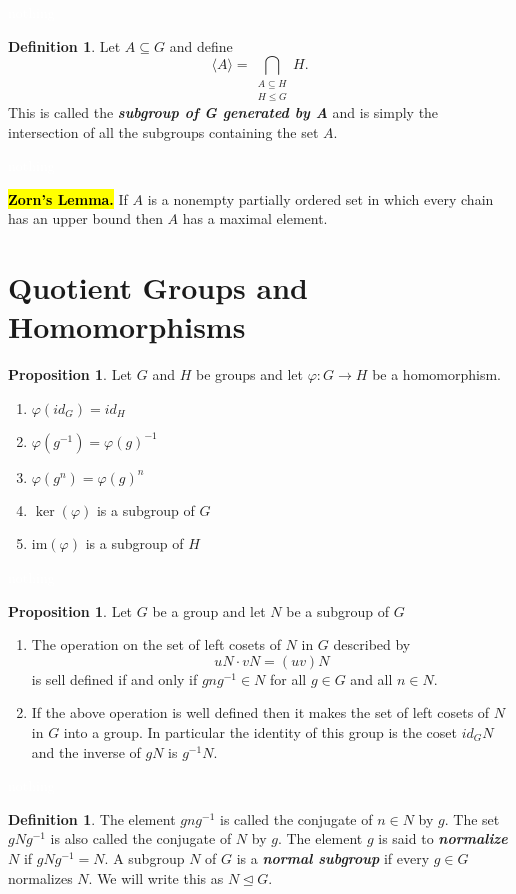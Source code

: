 \documentclass{article}
\theoremstyle{definition}
\newtheorem{prop}[thm]{Proposition}
\newtheorem{defn}[thm]{Definition}
\newcommand{\nl}{\textcolor{white}{nothing}}
\newcommand{\ra}{\rightarrow}
\newcommand{\seq}{\subseteq}
\newcommand{\im}{\text{im}}
\newcommand{\vphi}{\varphi}
\begin{document}
\nl
\begin{defn}
Let $A\seq G$ and define 
\[\langle A\rangle = \bigcap_{\substack{ A\seq H\\H\leq G}} H. \]
This is called the \textit{\textbf{subgroup of G generated by A}} and is simply the intersection of all the subgroups containing the set $A$.
\end{defn}


\nl

\hl{\textbf{Zorn's Lemma.}} If $A$ is a nonempty partially ordered set in which every chain has an upper bound then $A$ has a maximal element.


\section{Quotient Groups and Homomorphisms}

\setcounter{thm}{0}
\begin{prop}
Let $G$ and $H$ be groups and let $\vphi: G\ra H$ be a homomorphism.
\begin{enumerate}
\item $\vphi(id_G) = id_H$
\item $\vphi(g^{-1}) = \vphi(g)^{-1}$
\item $\vphi(g^n)= \vphi(g)^n$
\item $\ker(\vphi)$ is a subgroup of $G$
\item $\im(\vphi)$ is a subgroup of $H$
\end{enumerate}
\end{prop}

\nl
\begin{prop}\label{coset_op}
Let $G$ be a group and let $N$ be a subgroup of $G$
\begin{enumerate}
\item The operation on the set of left cosets of $N$ in $G$ described by
\[uN\cdot vN = (uv)N\]
is sell defined if and only if $gng^{-1}\in N$ for all $g\in G$ and all $n\in N$.
\item If the above operation is well defined then it makes the set of left cosets of $N$ in $G$ into a group. In particular the identity of this group is the coset $id_G N$and the inverse of $gN$ is $g^{-1}N$.
\end{enumerate}
\end{prop}

\nl


\begin{defn}
The element $gng^{-1}$ is called the conjugate of $n\in N$ by $g$. The set $gNg^{-1}$ is also called the conjugate of $N$ by $g$. The element $g$ is said to \textbf{\textit{normalize}} $N$ if $gNg^{-1} = N$. A subgroup $N$ of $G$ is a \textbf{\textit{normal subgroup}} if every $g\in G$ normalizes $N$. We will write this as $N \unlhd G$.
\end{defn}
\end{document}
